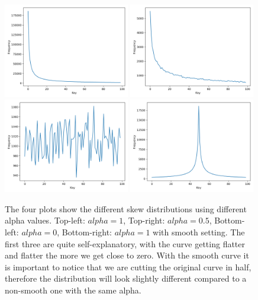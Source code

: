 \begin{figure}[!htb]
  \centering
  \includegraphics[width=0.49\textwidth,height=\textheight,keepaspectratio]{img/skew-alpha1.png}
  \includegraphics[width=0.49\textwidth,height=\textheight,keepaspectratio]{img/skew-alpha05.png}
  \includegraphics[width=0.49\textwidth,height=\textheight,keepaspectratio]{img/skew-alpha0.png}
  \includegraphics[width=0.49\textwidth,height=\textheight,keepaspectratio]{img/skew-alpha1smooth.png}
  \caption[caption]{ The four plots show the different skew distributions using different alpha values. Top-left: $alpha = 1$, Top-right: $alpha = 0.5$, Bottom-left: $alpha = 0$, Bottom-right: $alpha = 1$ with smooth setting. The first three are quite self-explanatory, with the curve getting flatter and flatter the more we get close to zero. With the smooth curve it is important to notice that we are cutting the original curve in half, therefore the distribution will look slightly different compared to a non-smooth one with the same alpha.}
  \label{fig:skews}
\end{figure}


